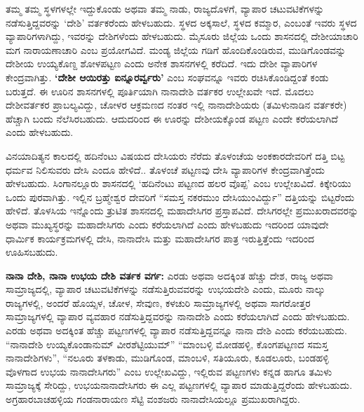 ತಮ್ಮ ತಮ್ಮ ಸ್ಥಳಗಳಲ್ಲೇ ಇದ್ದುಕೊಂಡು ಅಥವಾ ತಮ್ಮ ನಾಡು, ರಾಜ್ಯದೊಳಗೆ, ವ್ಯಾಪಾರ ಚಟುವಟಿಕೆಗಳನ್ನು ನಡೆಸುತ್ತಿದ್ದವರನ್ನು ‘ದೇಶಿ’ ವರ್ತಕರೆಂದು ಹೇಳಬಹುದು. ಸ್ಥಳದ ಅಕ್ಕಸಾಲೆ, ಸ್ಥಳದ ಕಮ್ಮಾರ, ಎಂಬಂತೆ ಇವರು ಸ್ಥಳದ ವ್ಯಾಪಾರಿಗಳಾಗಿದ್ದು, ಇವರನ್ನು ದೇಶಿಗಳೆಂದು ಹೇಳಬಹುದು. ಮೈಸೂರು ಜಿಲ್ಲೆಯ ಒಂದು ಶಾಸನದಲ್ಲಿ ದೇಶೀಯಾಚಾರಿ ಮಗ ನಾರಾಯಣಾಚಾರಿ ಎಂಬ ಪ್ರಯೋಗವಿದೆ. ಮಂಡ್ಯ ಜಿಲ್ಲೆಯ ಗಡಿಗೆ ಹೊಂದಿಕೊಂಡಿರುವ, ಮುಡಿಗೊಂಡವನ್ನು ದೇಶೀಯ ಉಯ್ಯಕೊಣ್ದ ಶೋಳಪಟ್ಟಣ ಎಂದು ಅನೇಕ ಶಾಸನಗಳಲ್ಲಿ ಕರೆದಿದೆ. ಇದು ದೇಶೀ ವ್ಯಾಪಾರಿಗಳ ಕೇಂದ್ರವಾಗಿತ್ತು. \textbf{‘ದೇಶೀ ಆಯಿರತ್ತು ಐನ್ನೂರರ್ವ್ವರು’} ಎಂಬ ಸಂಘವನ್ನೂ ಇವರು ರಚಿಸಿಕೊಂಡಿದ್ದಂತೆ ಕಂಡು ಬರುತ್ತದೆ. ಈ ಊರಿನ ಶಾಸನಗಳಲ್ಲಿ ಪೂರ್ತಿಯಾಗಿ ನಾನಾದೇಶಿ ವರ್ತಕರ ಉಲ್ಲೇಖವೇ ಇದೆ. ಮೊದಲು ದೇಶೀವರ್ತಕರ ಪ್ರಾಬಲ್ಯವಿದ್ದು, ಚೋಳರ ಆಕ್ರಮಣದ ನಂತರ ಇಲ್ಲಿ ನಾನಾದೇಶಿಯರು (ತಮಿಳುನಾಡಿನ ವರ್ತಕರೇ) ಹೆಚ್ಚಾಗಿ ಬಂದು ನೆಲೆಸಿರಬಹುದು. ಆದುದರಿಂದ ಈ ಊರನ್ನು ದೇಶೀಯಕ್ಕೊಂಡ ಪಟ್ಟಣ ಎಂದೇ ಕರೆಯಲಾಗಿದೆ ಎಂದು ಹೇಳಬಹುದು.

ವಿನಯಾದಿತ್ಯನ ಕಾಲದಲ್ಲಿ ಹದಿನೆಂಟು ವಿಷಯದ ದೇಸಿಯರು ನೆರೆದು ತೊಳಂಚೆಯ ಅಂಕಕಾರದೇವರಿಗೆ ದತ್ತಿ ಬಿಟ್ಟ ಧರ್ಮವ ನಿಲಿಸುವರು ದೇಸಿ ಎಂದೂ ಹೇಳಿದೆ.. ತೊಳಂಚೆ ಪಟ್ಟಣವು ದೇಸಿ ವ್ಯಾಪಾರಿಗಳ ಕೇಂದ್ರವಾಗಿತ್ತೆಂದು ಹೇಳಬಹುದು. ಸಿಂಗಾನಲ್ಲೂರು ಶಾಸನದಲ್ಲಿ ‘ಹದಿನೆಂಟು ಪಟ್ಟಣದ ಹಲರ ವೊಪ್ಪ’ ಎಂಬ ಉಲ್ಲೇಖವಿದೆ. ಕಿಕ್ಕೇರಿಯು ಒಂದು ಪುರವಾಗಿತ್ತು. ಇಲ್ಲಿನ ಬ್ರಹ್ಮೇಶ್ವರ ದೇವರಿಗೆ “ಸಮಸ್ತ ನಕರಮುಂ ದೇಸಿಯುಂವಿರ್ದ್ದು” ದತ್ತಿಯನ್ನು ಬಿಟ್ಟರೆಂದು ಹೇಳಿದೆ. ತೊಳಸಿಯ ಇನ್ನೊಂದು ತ್ರುಟಿತ ಶಾಸನದಲ್ಲಿ ಮಹಾದೇಸಿಗರ ಪ್ರಸ್ತಾಪವಿದೆ. ದೇಸಿಗರಲ್ಲೇ ಪ್ರಮುಖರಾದವರನ್ನು ಅಥವಾ ಮುಖ್ಯಸ್ಥರನ್ನು ಮಹಾದೇಸಿಗರು ಎಂದು ಕರೆಯಲಾಗಿದೆ ಎಂದು ಹೇಳಬಹುದು ಇದರಿಂದ ಯಾವುದೇ ಧಾರ್ಮಿಕ ಕಾರ್ಯಕ್ರಮಗಳಲ್ಲಿ ದೇಸಿ, ನಾನಾದೇಸಿ ಮತ್ತು ಮಹಾದೇಸಿಗರ ಪಾತ್ರ ಇರುತ್ತಿತ್ತೆಂದು ಇದರಿಂದ ಊಹಿಸಬಹುದು.

\textbf{ನಾನಾ ದೇಶಿ, ನಾನಾ ಉಭಯ ದೇಶಿ ವರ್ತಕ ವರ್ಗ: } ಎರಡು ಅಥವಾ ಅದಕ್ಕಿಂತ ಹೆಚ್ಚು ದೇಶ, ರಾಜ್ಯ ಅಥವಾ ಸಾಮ್ರಾಜ್ಯದಲ್ಲಿ, ವ್ಯಾಪಾರ ಚಟುವಟಿಕೆಗಳನ್ನು ನಡೆಸುತ್ತಿರುವವರನ್ನು ಉಭಯದೇಶಿ ಎಂದು, ಮೂರು ನಾಲ್ಕು ರಾಜ್ಯಗಳಲ್ಲಿ, ಅಂದರೆ ಹೊಯ್ಸಳ, ಚೋಳ, ಸೇವುಣ, ಕಳಚುರಿ ಸಾಮ್ರಾಜ್ಯಗಳಲ್ಲಿ ಅಥವಾ ಸಾಗರೋತ್ತರ ಸಾಮ್ರಾಜ್ಯಗಳಲ್ಲಿ ವ್ಯಾಪಾರ ವ್ಯವಹಾರ ನಡೆಸುತ್ತಿದ್ದವರನ್ನು ನಾನಾದೇಶಿ ಎಂದು ಕರೆಯಲಾಗಿದೆ ಎಂದು ಹೇಳಬಹುದು. ಎರಡು ಅಥವಾ ಅದಕ್ಕಿಂತ ಹೆಚ್ಚು ಪಟ್ಟಣಗಳಲ್ಲಿ ವ್ಯಾಪಾರ ನಡೆಸುತ್ತಿದ್ದವನ್ನೂ ನಾನಾ ದೇಶಿ ಎಂದು ಕರೆಯಬಹುದು. “ನಾನಾದೇಶಿ ಉಯ್ಯಕೊಂಡಾನುಮ್ ವೀರಶೆಟ್ಟಿಯುಮ್” “ಮಾಂಬಳ್ಳಿ ಮೋಡಹಳ್ಳಿ, ಕೊಂಗಪಟ್ಟಣದ ಸಮಸ್ತ ನಾನಾದೇಶಿಗಳು”, “ನಲೂರು ತಳಕಾಡು, ಮುಡಿಗೊಂಡ, ಮಾಂಬಳಿ, ಸತಿಯೂರು, ಕೂಡಲೂರು, ಬಂಡಹಳ್ಳಿ ವೊಳಗಾದ ಉಭಯ ನಾನಾದೇಸಿಗರು” ಎಂಬ ಉಲ್ಲೇಖವಿದ್ದು, ಇಲ್ಲಿರುವ ಪಟ್ಟಣಗಳು ಕನ್ನಡ ಹಾಗೂ ತಮಿಳು ಸಾಮ್ರಾಜ್ಯಕ್ಕೆ ಸೇರಿದ್ದು, ಉಭಯನಾನಾದೇಸಿಗರು ಈ ಎಲ್ಲ ಪಟ್ಟಣಗಳಲ್ಲಿ ವ್ಯಾಪಾರ ಮಾಡುತ್ತಿದ್ದರೆಂದು ಹೇಳಬಹುದು. ಅಗ್ರಹಾರಬಾಚಹಳ್ಳಿಯ ಗಂಡನಾರಾಯಣ ಸೆಟ್ಟಿ ವಂಶಜರು ನಾನಾದೇಸಿಯಲ್ಲೂ ಪ್ರಮುಖರಾಗಿದ್ದರು.

